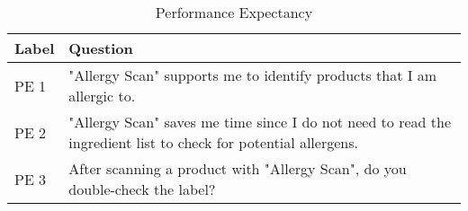 \begin{table}[H]
\centering
\begin{tabular}{l l}

\toprule
Label & Question \\
\midrule
PE 1    &	"Allergy Scan" supports me to identify products that I am allergic to.  \\
PE 2    &	"Allergy Scan" saves me time since I do not need to read the ingredient list to check for potential allergens. \\
PE 3    &	After scanning a product with "Allergy Scan", do you double-check the label? \\

\bottomrule

\end{tabular}
\caption{Performance Expectancy}
\end{table}